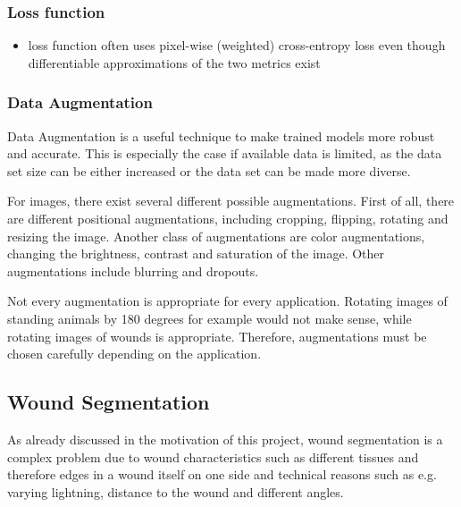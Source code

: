 
\subsubsection{Loss function}

\begin{itemize}
	\item loss function often uses pixel-wise (weighted) cross-entropy loss even though differentiable approximations of the two metrics exist \cite{Eelbode}
\end{itemize}


\subsubsection{Data Augmentation}

Data Augmentation is a useful technique to make trained models more robust and accurate. This is especially the case if available data is limited, as the data set size can be either increased or the data set can be made more diverse.

For images, there exist several different possible augmentations. First of all, there are different positional augmentations, including cropping, flipping, rotating and resizing the image. Another class of augmentations are color augmentations, changing the brightness, contrast and saturation of the image. Other augmentations include blurring and dropouts.

Not every augmentation is appropriate for every application. Rotating images of standing animals by 180 degrees for example would not make sense, while rotating images of wounds is appropriate. Therefore, augmentations must be chosen carefully depending on the application.




\subsection{Wound Segmentation}


As already discussed in the motivation of this project, wound segmentation is a complex problem due to wound characteristics such as different tissues and therefore edges in a wound itself on one side and technical reasons such as e.g. varying lightning, distance to the wound and different angles. 

